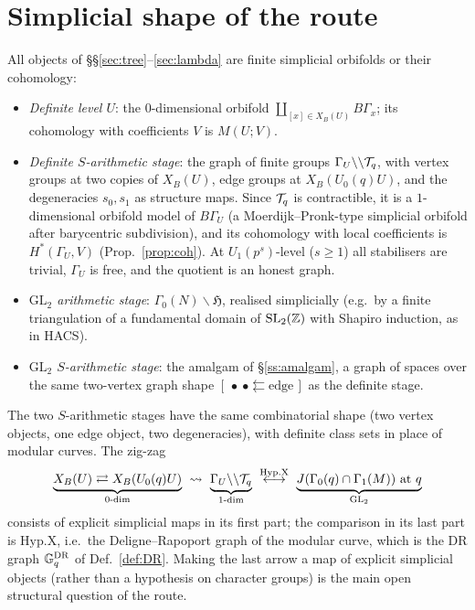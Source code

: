 \documentclass[11pt]{amsart}
\theoremstyle{plain}
\theoremstyle{definition}
\theoremstyle{remark}
\newcommand{\GL}{\mathrm{GL}}\newcommand{\SL}{\mathrm{SL}}\newcommand{\PGL}{\mathrm{PGL}}
\newcommand{\G}{\mathbb{G}}\newcommand{\Iw}{\mathrm{Iw}}\newcommand{\Hb}{\mathfrak{H}}
\begin{document}
\section{Simplicial shape of the route}\label{sec:simplicial}
All objects of \S\S\ref{sec:tree}--\ref{sec:lambda} are finite simplicial orbifolds or their cohomology:
\begin{itemize}
\item \emph{Definite level $U$}: the $0$-dimensional orbifold $\coprod_{[x]\in X_B(U)}B\Gamma_x$; its cohomology with coefficients $V$ is $M(U;V)$.
\item \emph{Definite $S$-arithmetic stage}: the graph of finite groups $\Gamma_U\backslash\backslash\mathcal{T}_q$, with vertex groups at two copies of $X_B(U)$, edge groups at $X_B(U_0(q)U)$, and the degeneracies $s_0,s_1$ as structure maps. Since $\mathcal{T}_q$ is contractible, it is a $1$-dimensional orbifold model of $B\Gamma_U$ (a Moerdijk--Pronk-type simplicial orbifold after barycentric subdivision), and its cohomology with local coefficients is $H^*(\Gamma_U,V)$ (Prop.~\ref{prop:coh}). At $U_1(p^s)$-level ($s\ge1$) all stabilisers are trivial, $\Gamma_U$ is free, and the quotient is an honest graph.
\item \emph{$\GL_2$ arithmetic stage}: $\Gamma_0(N)\backslash\Hb$, realised simplicially (e.g.\ by a finite triangulation of a fundamental domain of $\SL_2(\Z)$ with Shapiro induction, as in HACS).
\item \emph{$\GL_2$ $S$-arithmetic stage}: the amalgam of \S\ref{ss:amalgam}, a graph of spaces over the same two-vertex graph shape $[\,\bullet\ \bullet\leftleftarrows\text{edge}\,]$ as the definite stage.
\end{itemize}
The two $S$-arithmetic stages have the same combinatorial shape (two vertex objects, one edge object, two degeneracies), with definite class sets in place of modular curves. The zig-zag
\[\underbrace{X_B(U)\rightleftarrows X_B(U_0(q)U)}_{\text{0-dim}}\ \leadsto\ \underbrace{\Gamma_U\backslash\backslash\cT_q}_{\text{1-dim}}\ \overset{\mathrm{Hyp.X}}{\longleftrightarrow}\ \underbrace{J(\Gamma_0(q)\cap\Gamma_1(M))\text{ at }q}_{\GL_2}\]
consists of explicit simplicial maps in its first part; the comparison in its last part is $\mathrm{Hyp.X}$, i.e.\ the Deligne--Rapoport graph of the modular curve, which is the DR graph $\G^{\rm DR}_q$ of Def.~\ref{def:DR}. Making the last arrow a map of explicit simplicial objects (rather than a hypothesis on character groups) is the main open structural question of the route.
\end{document}
